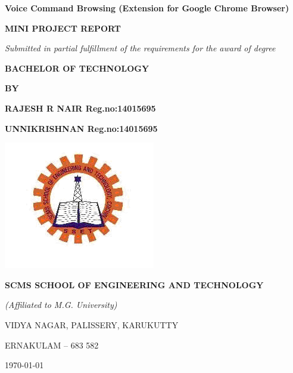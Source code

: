 \documentclass[11pt]{article} %
\begin{document}
	
	\thispagestyle{empty}
	\begin{center}
		\begin{minipage}{\linewidth}
			\centering
			\vspace{2cm}
			{\Huge \bf{Voice Command Browsing (Extension for Google Chrome  Browser)}\par}
			\vspace{1cm}
			{\Large \bfseries{MINI PROJECT REPORT}\par}
			\vspace{0.5cm}
			{\Large \emph{Submitted in partial fulfillment of the requirements for the award of degree}\par}
			\vspace{0.5cm}
			{\Large \bf{BACHELOR OF TECHNOLOGY} \par}
			\vspace{0.5cm}
			{\Large \bf{BY} \par}
			\vspace{1cm}
			{\Large \bf{RAJESH R NAIR}\hspace{3cm}     Reg.no:14015695 \par}
			{\Large \bf{UNNIKRISHNAN}\hspace{3cm}      Reg.no:14015695 \par}
			\vspace{1cm}
			\includegraphics[width=0.5\linewidth]{figures/logo.png}
			
			{\Large \bfseries{SCMS SCHOOL OF ENGINEERING AND TECHNOLOGY}\par}
			{\Large \emph{(Affiliated to M.G. University)}\par}
			{\Large VIDYA NAGAR, PALISSERY, KARUKUTTY\par}
			{\Large ERNAKULAM – 683 582\par}
			\vspace{1cm}
			
			
			{\Large \monthyeardate \today}
		\end{minipage}
	\end{center}
	\clearpage
	
\end{document}
